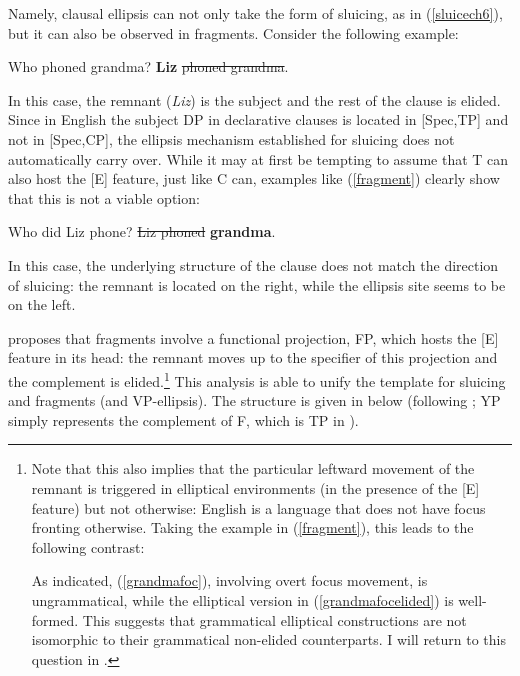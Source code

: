 Namely, clausal ellipsis can not only take the form of sluicing, as in (\ref{sluicech6}), but it can also be observed in fragments. Consider the following example:

\begin{exe}
\ex
\begin{xlist} 
 Who phoned grandma?
 \textbf{Liz} \sout{phoned grandma}.
\end{xlist}
\end{exe}

In this case, the remnant (\textit{Liz}) is the subject and the rest of the clause is elided. Since in English the subject DP in declarative clauses is located in [Spec,TP] and not in [Spec,CP], the ellipsis mechanism established for sluicing does not automatically carry over. While it may at first be tempting to assume that T can also host the [E] feature, just like C can, examples like (\ref{fragment}) clearly show that this is not a viable option:

\begin{exe}
\ex \label{fragment}
\begin{xlist} 
 Who did Liz phone?
 \sout{Liz phoned} \textbf{grandma}.
\end{xlist}
\end{exe}

In this case, the underlying structure of the clause does not match the direction of sluicing: the remnant is located on the right, while the ellipsis site seems to be on the left.

\citet{merchant2004} proposes that fragments involve a functional projection, FP, which hosts the [E] feature in its head: the remnant moves up to the specifier of this projection and the complement is elided.\footnote{Note that this also implies that the particular leftward movement of the remnant is triggered in elliptical environments (in the presence of the [E] feature) but not otherwise: English is a language that does not have focus fronting otherwise. Taking the example in (\ref{fragment}), this leads to the following contrast:

\z

As indicated, (\ref{grandmafoc}), involving overt focus movement, is ungrammatical, while the elliptical version in (\ref{grandmafocelided}) is well-formed. This suggests that grammatical elliptical constructions are not isomorphic to their grammatical non-elided counterparts. I will return to this question in .} This analysis is able to unify the template for sluicing and fragments (and VP-ellipsis). The structure is given in  below (following \citealt[675]{merchant2004}; YP simply represents the complement of F, which is TP in \citealt{merchant2004}).

